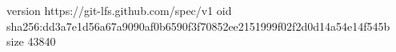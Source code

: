 version https://git-lfs.github.com/spec/v1
oid sha256:dd3a7e1d56a67a9090af0b6590f3f70852ee2151999f02f2d0d14a54e14f545b
size 43840

